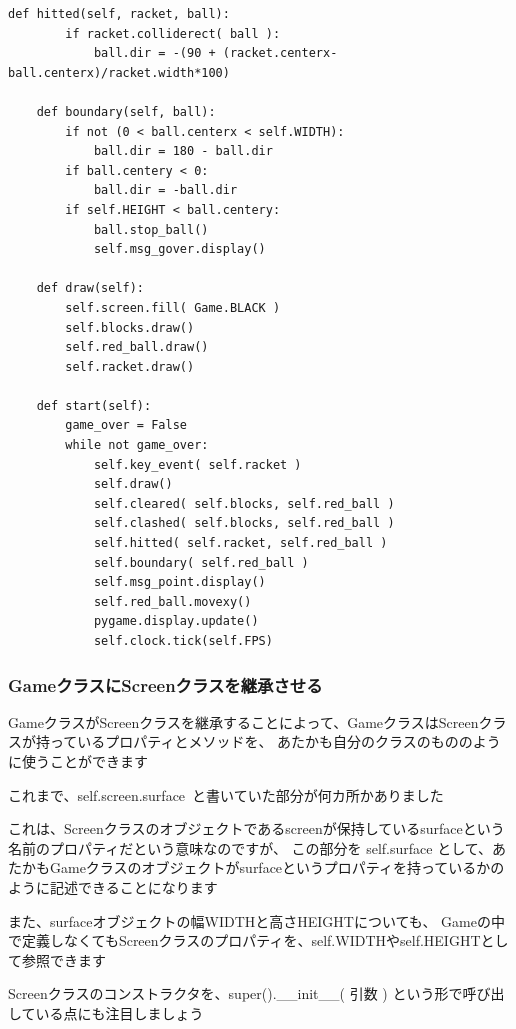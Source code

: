\documentclass[uplatex,a4paper,11pt,oneside,openany]{jsbook}
\begin{document}
\begin{lstlisting}[caption=Gameクラス（blocksオブジェクトを追加）,label=p1]
    def hitted(self, racket, ball):
        if racket.colliderect( ball ):
            ball.dir = -(90 + (racket.centerx-ball.centerx)/racket.width*100)

    def boundary(self, ball):
        if not (0 < ball.centerx < self.WIDTH):
            ball.dir = 180 - ball.dir
        if ball.centery < 0:
            ball.dir = -ball.dir
        if self.HEIGHT < ball.centery:
            ball.stop_ball()
            self.msg_gover.display()

    def draw(self):
        self.screen.fill( Game.BLACK )
        self.blocks.draw()
        self.red_ball.draw()
        self.racket.draw()

    def start(self):
        game_over = False
        while not game_over:
            self.key_event( self.racket )
            self.draw()
            self.cleared( self.blocks, self.red_ball )
            self.clashed( self.blocks, self.red_ball )
            self.hitted( self.racket, self.red_ball )
            self.boundary( self.red_ball )
            self.msg_point.display()
            self.red_ball.movexy()
            pygame.display.update()
            self.clock.tick(self.FPS)
\end{lstlisting}

\subsubsection{GameクラスにScreenクラスを継承させる}

GameクラスがScreenクラスを継承することによって、GameクラスはScreenクラスが持っているプロパティとメソッドを、
あたかも自分のクラスのもののように使うことができます

これまで、self.screen.surface と書いていた部分が何カ所かありました

これは、Screenクラスのオブジェクトであるscreenが保持しているsurfaceという名前のプロパティだという意味なのですが、
この部分を self.surface として、あたかもGameクラスのオブジェクトがsurfaceというプロパティを持っているかのように記述できることになります

また、surfaceオブジェクトの幅WIDTHと高さHEIGHTについても、
Gameの中で定義しなくてもScreenクラスのプロパティを、self.WIDTHやself.HEIGHTとして参照できます

Screenクラスのコンストラクタを、super().\_\_init\_\_( 引数 ) という形で呼び出している点にも注目しましょう
\end{document}
